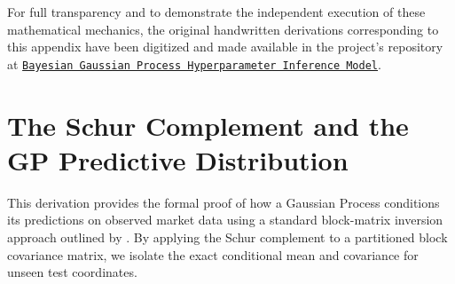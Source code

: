 \documentclass[12pt,oneside]{report}
\theoremstyle{definition}
\theoremstyle{remark}
\begin{document}
For full transparency and to demonstrate the independent execution of these mathematical mechanics, the original handwritten derivations corresponding to this appendix have been digitized and made available in the project's repository at \href{https://github.com/mishavelial/Bayesian Gaussian Process Hyperparameter Inference Model}{\texttt{Bayesian Gaussian Process Hyperparameter Inference Model}}.

\section{The Schur Complement and the GP Predictive Distribution}
\label{sec:schur_complement}

This derivation provides the formal proof of how a Gaussian Process conditions its predictions on observed market data using a standard block-matrix inversion approach outlined by \citet{rasmussen2006gp}. By applying the Schur complement to a partitioned block covariance matrix, we isolate the exact conditional mean and covariance for unseen test coordinates.
\end{document}
